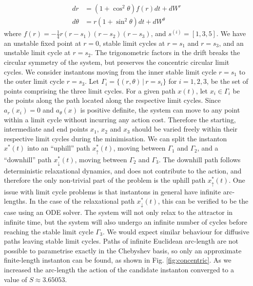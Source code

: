 \begin{equation}
\begin{aligned}dr & =(1+\cos^{2}\theta)f(r)dt+dW^{r}\\
d\theta & =r(1+\sin^{2}\theta)dt+dW^{\theta}
\end{aligned}
\label{eq:limit-cycle system}
\end{equation}
where $f(r)=-\frac{1}{4}r(r-s_{1})(r-s_{2})(r-s_{3})$, and $s^{(i)}=[1,3,5]$.
We have an unstable fixed point at $r=0$, stable limit cycles at
$r=s_{1}$ and $r=s_{3}$, and an unstable limit cycle at $r=s_{2}$.
The trigonometric factors in the drift breaks the circular symmetry
of the system, but preserves the concentric circular limit cycles.
We consider instantons moving from the inner stable limit cycle $r=s_{1}$
to the outer limit cycle $r=s_{3}$. Let $\Gamma_{i}=\{(r,\theta)\,|\,r=s_{i}\}$
for $i=1,2,3$, be the set of points comprising the three limit cycles.
For a given path $x(t)$, let $x_{i}\in\Gamma_{i}$ be the points
along the path located along the respective limit cycles. Since $a_{r}(x_{i})=0$
and $a_{\theta}(x)$ is positive definite, the system can move to
any point within a limit cycle without incurring any action cost.
Therefore the starting, intermediate and end points $x_{1}$, $x_{2}$
and $x_{3}$ should be varied freely within their respective limit
cycles during the minimisation. We can split the instanton $x^{*}(t)$
into an ``uphill'' path $x_{\uparrow}^{*}(t)$, moving between $\Gamma_{1}$
and $\Gamma_{2}$, and a ``downhill'' path $x_{\downarrow}^{*}(t)$,
moving between $\Gamma_{2}$ and $\Gamma_{3}$. The downhill path
follows deterministic relaxational dynamics, and does not contribute
to the action, and therefore the only non-trivial part of the problem
is the uphill path $x_{\uparrow}^{*}(t)$. One issue with limit cycle
problems is that instantons in general have infinite arc-lengths.
In the case of the relaxational path $x_{\downarrow}^{*}(t)$, this
can be verified to be the case using an ODE solver. The system will
not only relax to the attractor in infinite time, but the system will
also undergo an infinite number of cycles before reaching the stable
limit cycle $\Gamma_{3}$. We would expect similar behaviour for diffusive
paths leaving stable limit cycles. Paths of infinite Euclidean arc-length
are not possible to parametrise exactly in the Chebyshev basis, so
only an approximate finite-length instanton can be found, as shown
in Fig. \ref{fig:concentric}. As we increased the arc-length the action of the candidate instanton converged to a value of $S\approx3.65053$.
